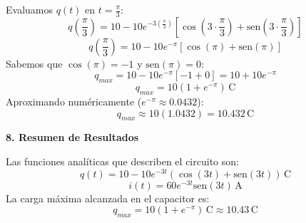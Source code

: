 \documentclass[a4paper]{article}
\begin{document}
Evaluamos $q(t)$ en $t = \frac{\pi}{3}$:
$$
q\left(\frac{\pi}{3}\right) = 10 - 10e^{-3(\frac{\pi}{3})} \left[ \cos\left(3 \cdot \frac{\pi}{3}\right) + \text{sen}\left(3 \cdot \frac{\pi}{3}\right) \right]
$$
$$
q\left(\frac{\pi}{3}\right) = 10 - 10e^{-\pi} [\cos(\pi) + \text{sen}(\pi)]
$$
Sabemos que $\cos(\pi) = -1$ y $\text{sen}(\pi) = 0$:
$$
q_{max} = 10 - 10e^{-\pi} [-1 + 0] = 10 + 10e^{-\pi}
$$
$$
q_{max} = 10(1 + e^{-\pi}) \, \text{C}
$$
Aproximando numéricamente ($e^{-\pi} \approx 0.0432$):
$$
q_{max} \approx 10(1.0432) = 10.432 \, \text{C}
$$

\textbf{8. Resumen de Resultados}

Las funciones analíticas que describen el circuito son:
$$
q(t) = 10 - 10e^{-3t} (\cos(3t) + \text{sen}(3t)) \, \text{C}
$$
$$
i(t) = 60 e^{-3t} \text{sen}(3t) \, \text{A}
$$
La carga máxima alcanzada en el capacitor es:
$$
q_{max} = 10(1 + e^{-\pi}) \, \text{C} \approx 10.43 \, \text{C}
$$



 
\end{document}
